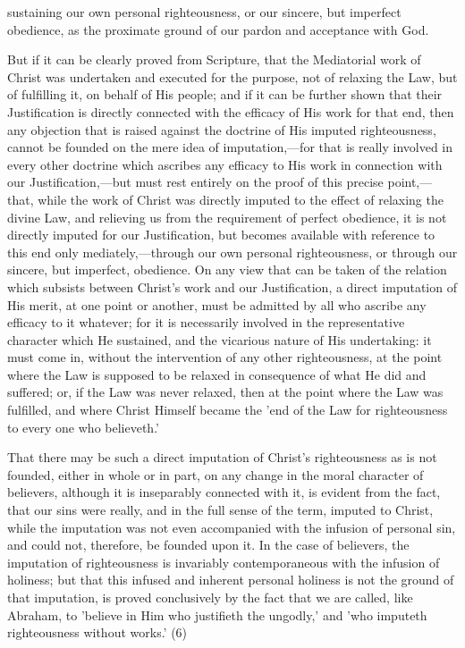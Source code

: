 \documentclass[
]{book}
\begin{document}
sustaining our own personal righteousness, or our sincere, but imperfect obedience, as the proximate ground of our pardon and acceptance with God.

But if it can be clearly proved from Scripture, that the Mediatorial work of Christ was undertaken and executed for the purpose, not of relaxing the Law, but of fulfilling it, on behalf of His people; and if it can be further shown that their Justification is directly connected with the efficacy of His work for that end, then any objection that is raised against the doctrine of His imputed righteousness, cannot be founded on the mere idea of imputation,---for that is really involved in every other doctrine which ascribes any efficacy to His work in connection with our Justification,---but must rest entirely on the proof of this precise point,---that, while the work of Christ was directly imputed to the effect of relaxing the divine Law, and relieving us from the requirement of perfect obedience, it is not directly imputed for our Justification, but becomes available with reference to this end only mediately,---through our own personal righteousness, or through our sincere, but imperfect, obedience. On any view that can be taken of the relation which subsists between Christ's work and our Justification, a direct imputation of His merit, at one point or another, must be admitted by all who ascribe any efficacy to it whatever; for it is necessarily involved in the representative character which He sustained, and the vicarious nature of His undertaking: it must come in, without the intervention of any other righteousness, at the point where the Law is supposed to be relaxed in consequence of what He did and suffered; or, if the Law was never relaxed, then at the point where the Law was fulfilled, and where Christ Himself became the 'end of the Law for righteousness to every one who believeth.'

That there may be such a direct imputation of Christ's righteousness as is not founded, either in whole or in part, on any change in the moral character of believers, although it is inseparably connected with it, is evident from the fact, that our sins were really, and in the full sense of the term, imputed to Christ, while the imputation was not even accompanied with the infusion of personal sin, and could not, therefore, be founded upon it. In the case of believers, the imputation of righteousness is invariably contemporaneous with the infusion of holiness; but that this infused and inherent personal holiness is not the ground of that imputation, is proved conclusively by the fact that we are called, like Abraham, to 'believe in Him who justifieth the ungodly,' and 'who imputeth righteousness without works.' (6)
\end{document}
